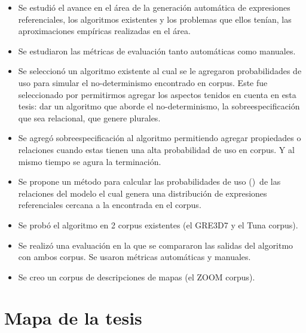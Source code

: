 \begin{itemize}
\item Se estudi\'o el avance en el \'area de la generaci\'on autom\'atica de expresiones referenciales, los algoritmos existentes y los problemas que ellos ten\'ian, las aproximaciones emp\'iricas realizadas en el \'area.
\item Se estudiaron las m\'etricas de evaluaci\'on tanto autom\'aticas como manuales.
\item Se seleccion\'o un algoritmo existente al cual se le agregaron probabilidades de uso para simular el no-determinismo encontrado en corpus. Este fue seleccionado por permitirmos agregar los aspectos tenidos en cuenta en esta tesis: dar un algoritmo que aborde el no-determinismo, la sobreespecificaci\'on que sea relacional, que genere plurales.
\item Se agreg\'o sobreespecificaci\'on al algoritmo permitiendo agregar propiedades o relaciones cuando estas tienen una alta probabilidad de uso en corpus. Y al mismo tiempo se agura la terminaci\'on.
\item Se propone un m\'etodo para calcular las probabilidades de uso (\puse)\ de las relaciones del modelo el cual genera una distribuci\'on de expresiones referenciales cercana a la encontrada en el corpus.
\item Se prob\'o el algoritmo en 2 corpus existentes (el GRE3D7 y el Tuna corpus).
\item Se realiz\'o una evaluaci\'on en la que se compararon las salidas del algoritmo con ambos corpus. Se usaron m\'etricas autom\'aticas y manuales.
\item Se creo un corpus de descripciones de mapas (el ZOOM corpus).
\end{itemize}

\section{Mapa de la tesis}
\label{sec:mapadetesis}
